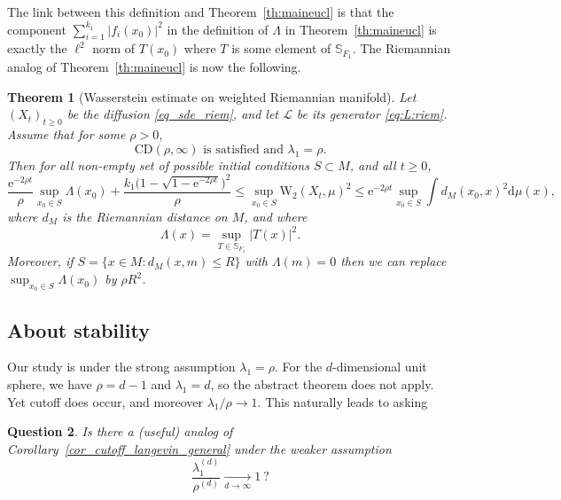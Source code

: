 \documentclass[10pt,reqno]{amsart}
\newtheorem{theorem}{Theorem}[section]
\newtheorem{question}[theorem]{Question}
\numberwithin{equation}{section}
\begin{document}
The link between this definition and Theorem~\ref{th:maineucl} is that the
component $\sum_{i=1}^{k_1}|f_i(x_0)|^2$ in the definition of $\Lambda$ in
Theorem~\ref{th:maineucl} is exactly the $\ell^2$ norm of $T(x_0)$ where $T$
is some element of $\mathbb{S}_{F_1}$. The Riemannian analog of
Theorem~\ref{th:maineucl} is now the following.

\begin{theorem}[Wasserstein estimate on weighted Riemannian manifold]\label{main_thm_riem}
  Let ${(X_t)}_{t\geq0}$ be the diffusion \eqref{eq_sde_riem}, and let
  $\mathcal{L}$ be its generator \eqref{eq:L:riem}. Assume that for some
  $\rho>0$,
  \begin{equation}
   \text{$\mathrm{CD}(\rho, \infty)$ is satisfied and $\lambda_1 = \rho$}.
  \end{equation}
  Then for all non-empty set of possible initial conditions $S\subset M$, and all $t\geq0$, 
  \begin{equation} 
    \frac{\mathrm{e}^{-2\rho t}}{\rho}\sup_{x_0 \in S}\Lambda(x_0) %
     +\frac{k_1\bigl(1-\sqrt{1-\mathrm{e}^{-2\rho t}}\bigr)^2}{\rho} %
    \leq \sup_{x_0\in S}\mathrm{W}_2(X_t, \mu)^2 %
    \leq \mathrm{e}^{-2\rho t} \sup_{x_0 \in S}\int d_M(x_0, x)^2\mathrm{d}\mu(x),
  \end{equation}
  where $d_M$ is the Riemannian distance on $M$, and where
  \begin{equation}
    \Lambda(x)=\sup_{T\in\mathbb{S}_{F_1}}|T(x)|^2.
  \end{equation}
  Moreover, if $S=\{x\in M:d_M(x,m)\leq R\}$ with $\Lambda(m)=0$ then we can
  replace $\sup_{x_0\in S}\Lambda(x_0)$ by $\rho R^2$.
\end{theorem}

\subsection{About stability}

Our study is under the strong assumption $\lambda_1 = \rho$. For the
$d$-dimensional unit sphere, we have $\rho = d-1$ and $\lambda_1 = d$, so the
abstract theorem does not apply. Yet cutoff does occur, and moreover
$\lambda_1/\rho \longrightarrow 1$. This naturally leads to asking

\begin{question}
  Is there a (useful) analog of Corollary~\ref{cor_cutoff_langevin_general}
  under the weaker assumption
  \begin{equation}
    \frac{\lambda_1^{(d)}}{\rho^{(d)}} 
    \xrightarrow[d\to\infty]{}1\ ?
  \end{equation}
\end{question}
\end{document}
